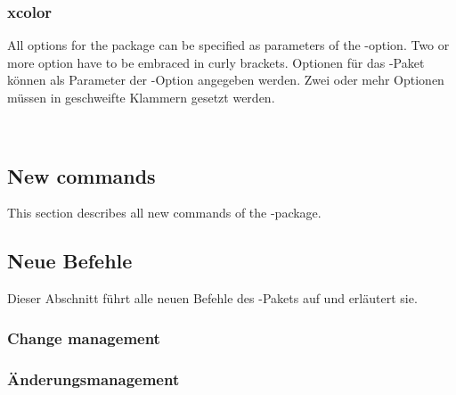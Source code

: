 \subsubsection{xcolor}

\ifENGLISH
	All options for the  package can be specified as parameters of the -option.
	Two or more option have to be embraced in curly brackets.
\fi
	\ifGERMAN
		Optionen für das -Paket können als Parameter der -Option angegeben werden.
		Zwei oder mehr Optionen müssen in geschweifte Klammern gesetzt werden.
	\fi

\\

\ifENGLISH
	\subsection{New commands}

	This section describes all new commands of the -package.
\fi
	\ifGERMAN
		\subsection{Neue Befehle}

		Dieser Abschnitt führt alle neuen Befehle des -Pakets auf und erläutert sie.
	\fi

\ifENGLISH
	\subsubsection{Change management}
\fi
	\ifGERMAN
		\subsubsection{Änderungsmanagement}
	\fi


